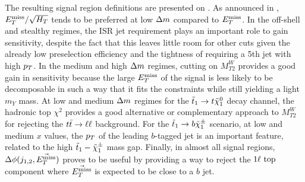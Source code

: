     The resulting signal region definitions are presented on
    .  As announced in
    , $E_T^\text{miss}/\sqrt{H_T}$ tends to be preferred
    at low $\Delta m$ compared to $E_T^\text{miss}$. In the off-shell and stealthy regimes,
    the ISR jet requirement plays an important role to gain sensitivity, despite
    the fact that this leaves little room for other cuts given the already low
    preselection efficiency and the tightness of requiring a 5th jet with high
    $p_T$.  In the medium and high $\Delta m$ regimes, cutting on $M_{T2}^W$
    provides a good gain in sensitivity because the large $E_T^\text{miss}$ of the signal
    is less likely to be decomposable in such a way that it fits the constraints
    while still yielding a light $m_Y$ mass.  At low and medium $\Delta m$
    regimes for the $\tilde{t}_1 \rightarrow t \tilde{\chi}_1^0$ decay channel, the
    hadronic top $\chi^2$ provides a good alternative or complementary approach
    to $M_{T2}^{W}$ for rejecting the $t\bar{t} \rightarrow \ell \ell$ background. For the $\tilde{t}_1
    \rightarrow b \tilde{\chi}_1^\pm$ scenario, at low and medium $x$ values, the $p_T$
    of the leading $b$-tagged jet is an important feature, related to the high
    $\tilde{t}_1-\tilde{\chi}_1^\pm$ mass gap. Finally, in almost all signal regions,
    $\Delta\phi(j_{1,2},\vec{E_T^\text{miss}})$ proves to be useful by providing a way to
    reject the $1\ell~\text{top}$ component where $\vec{E_T^\text{miss}}$ is expected to be
    close to a $b$ jet.

